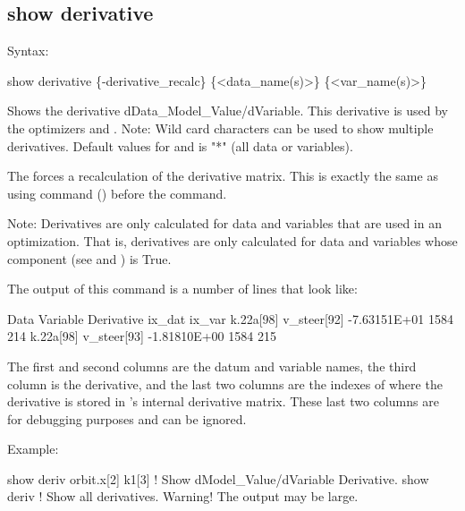 {{{{{{{{%

\subsection{show derivative}
\label{s:show.derivative}

Syntax:
\begin{example}
  show derivative \{-derivative_recalc\} \{<data_name(s)>\} \{<var_name(s)>\}
\end{example}

Shows the derivative dData_Model_Value/dVariable. This derivative is used by the optimizers
 and . Note: Wild card characters can be used to show multiple derivatives.
Default values for  and  is "*" (all data or variables).

The  forces a recalculation of the derivative matrix. This is exactly the
same as using  command () before the  command.

Note: Derivatives are only calculated for data and variables that are used in an optimization.  That
is, derivatives are only calculated for data and variables whose  component (see
 and ) is True.

The output of this command is a number of lines that look like:
\begin{example}
  Data                Variable               Derivative   ix_dat  ix_var
  k.22a[98]           v_steer[92]           -7.63151E+01    1584     214
  k.22a[98]           v_steer[93]           -1.81810E+00    1584     215
\end{example}
The first and second columns are the datum and variable names, the third column is the derivative,
and the last two columns are the indexes of where the derivative is stored in \tao's internal
derivative matrix. These last two columns are for debugging purposes and can be ignored.

Example:
\begin{example}
  show deriv orbit.x[2] k1[3] ! Show dModel_Value/dVariable Derivative.
  show deriv                  ! Show all derivatives. Warning! The output may be large.

\end{example}


}}}}}}}}
